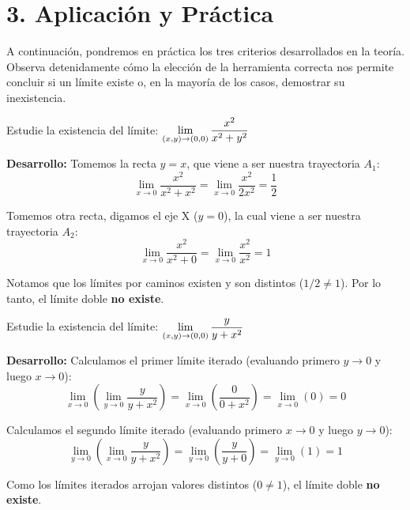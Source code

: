 \documentclass[11pt]{article}
\newenvironment{aplicacion}{%
  \section*{3. Aplicación y Práctica}%
}{}
\newenvironment{ejemplo}[1]{%
  \begin{tcolorbox}[colback=white,colframe=gray!40,title=Ejemplo: #1]%
}{%
  \end{tcolorbox}%
}
\begin{document}
\begin{aplicacion}
  A continuación, pondremos en práctica los tres criterios desarrollados en la teoría. Observa detenidamente cómo la elección de la herramienta correcta nos permite concluir si un límite existe o, en la mayoría de los casos, demostrar su inexistencia.

  \begin{ejemplo}{Criterio 1: Inexistencia por Caminos (Rectas)}
    Estudie la existencia del límite: $\displaystyle \displaystyle\lim_{(x,y) \to (0,0)} \dfrac{x^2}{x^2 + y^2}$
    
    \textbf{Desarrollo:}
    Tomemos la recta $y = x$, que viene a ser nuestra trayectoria $A_1$:
    $$ \displaystyle\lim_{x \to 0} \dfrac{x^2}{x^2 + x^2} = \displaystyle\lim_{x \to 0} \dfrac{x^2}{2x^2} = \dfrac{1}{2} $$
    
    Tomemos otra recta, digamos el eje X ($y = 0$), la cual viene a ser nuestra trayectoria $A_2$:
    $$ \displaystyle\lim_{x \to 0} \dfrac{x^2}{x^2 + 0} = \displaystyle\lim_{x \to 0} \dfrac{x^2}{x^2} = 1 $$
    
    Notamos que los límites por caminos existen y son distintos ($1/2 \neq 1$). Por lo tanto, el límite doble \textbf{no existe}.
  \end{ejemplo}

  \begin{ejemplo}{Criterio 2: Inexistencia por Límites Iterados}
    Estudie la existencia del límite: $\displaystyle \displaystyle\lim_{(x,y) \to (0,0)} \dfrac{y}{y + x^2}$
    
    \textbf{Desarrollo:}
    Calculamos el primer límite iterado (evaluando primero $y \to 0$ y luego $x \to 0$):
    $$ \displaystyle\lim_{x \to 0} \left( \displaystyle\lim_{y \to 0} \dfrac{y}{y + x^2} \right) = \displaystyle\lim_{x \to 0} \left( \dfrac{0}{0 + x^2} \right) = \displaystyle\lim_{x \to 0} (0) = 0 $$
    
    Calculamos el segundo límite iterado (evaluando primero $x \to 0$ y luego $y \to 0$):
    $$ \displaystyle\lim_{y \to 0} \left( \displaystyle\lim_{x \to 0} \dfrac{y}{y + x^2} \right) = \displaystyle\lim_{y \to 0} \left( \dfrac{y}{y + 0} \right) = \displaystyle\lim_{y \to 0} (1) = 1 $$
    
    Como los límites iterados arrojan valores distintos ($0 \neq 1$), el límite doble \textbf{no existe}.
  \end{ejemplo}


\end{aplicacion}
\end{document}
